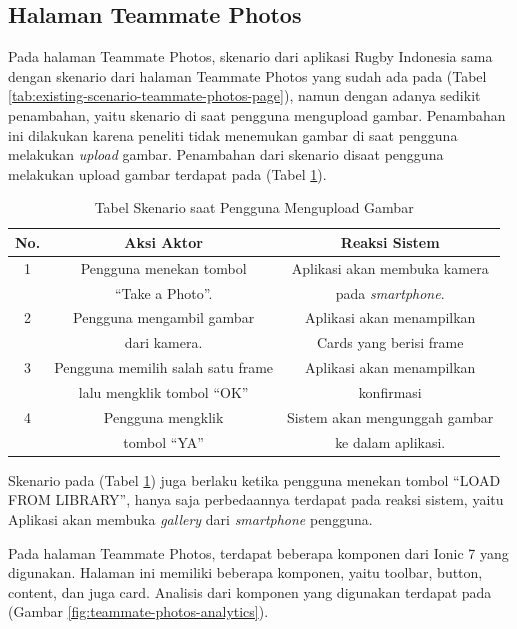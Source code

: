 \subsection{Halaman Teammate Photos}
Pada halaman Teammate Photos, skenario dari aplikasi Rugby Indonesia sama dengan skenario dari halaman Teammate Photos yang sudah ada pada (Tabel \ref{tab:existing-scenario-teammate-photos-page}), namun dengan adanya sedikit penambahan, yaitu skenario di saat pengguna mengupload gambar. Penambahan ini dilakukan karena peneliti tidak menemukan gambar di saat pengguna melakukan \textit{upload} gambar. Penambahan dari skenario disaat pengguna melakukan upload gambar terdapat pada (Tabel \ref{tab:usulan-skenario-halaman-teammate-photos}).
\begin{table} [H]
    \centering
    \caption{Tabel Skenario saat Pengguna Mengupload Gambar}
    \begin{tabular}{|c|c|c|}
    \hline
       No. & Aksi Aktor & Reaksi Sistem  \\ \hline
        1 & Pengguna menekan tombol  & Aplikasi akan membuka kamera \\
         & ``Take a Photo''. & pada \textit{smartphone}. \\ \hline
        2 & Pengguna mengambil gambar & Aplikasi akan menampilkan \\ 
         & dari kamera. & Cards yang berisi frame \\ \hline
        3 & Pengguna memilih salah satu frame & Aplikasi akan menampilkan \\ 
         & lalu mengklik tombol ``OK'' & konfirmasi \\ \hline
        4 & Pengguna mengklik & Sistem akan mengunggah gambar \\ 
         & tombol ``YA'' & ke dalam aplikasi. \\ \hline
    \end{tabular}
    \label{tab:usulan-skenario-halaman-teammate-photos}
\end{table}

Skenario pada (Tabel \ref{tab:usulan-skenario-halaman-teammate-photos}) juga berlaku ketika pengguna menekan tombol ``LOAD FROM LIBRARY'', hanya saja perbedaannya terdapat pada reaksi sistem, yaitu Aplikasi akan membuka \textit{gallery} dari \textit{smartphone} pengguna.

Pada halaman Teammate Photos, terdapat beberapa komponen dari Ionic 7 yang digunakan. Halaman ini memiliki beberapa komponen, yaitu toolbar, button, content, dan juga card. Analisis dari komponen yang digunakan terdapat pada (Gambar \ref{fig:teammate-photos-analytics}).

